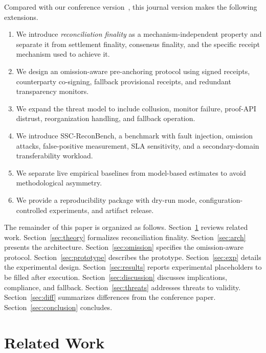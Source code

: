\documentclass[journal]{IEEEtran}
\begin{document}
Compared with our conference version~\cite{le2026ssc}, this journal version makes the following extensions.

\begin{enumerate}[leftmargin=2em]
    \item We introduce \emph{reconciliation finality} as a mechanism-independent property and separate it from settlement finality, consensus finality, and the specific receipt mechanism used to achieve it.
    \item We design an omission-aware pre-anchoring protocol using signed receipts, counterparty co-signing, fallback provisional receipts, and redundant transparency monitors.
    \item We expand the threat model to include collusion, monitor failure, proof-API distrust, reorganization handling, and fallback operation.
    \item We introduce SSC-ReconBench, a benchmark with fault injection, omission attacks, false-positive measurement, SLA sensitivity, and a secondary-domain transferability workload.
    \item We separate live empirical baselines from model-based estimates to avoid methodological asymmetry.
    \item We provide a reproducibility package with dry-run mode, configuration-controlled experiments, and artifact release.
\end{enumerate}

The remainder of this paper is organized as follows. Section~\ref{sec:related} reviews related work. Section~\ref{sec:theory} formalizes reconciliation finality. Section~\ref{sec:arch} presents the architecture. Section~\ref{sec:omission} specifies the omission-aware protocol. Section~\ref{sec:prototype} describes the prototype. Section~\ref{sec:exp} details the experimental design. Section~\ref{sec:results} reports experimental placeholders to be filled after execution. Section~\ref{sec:discussion} discusses implications, compliance, and fallback. Section~\ref{sec:threats} addresses threats to validity. Section~\ref{sec:diff} summarizes differences from the conference paper. Section~\ref{sec:conclusion} concludes.

\section{Related Work}
\label{sec:related}
\end{document}
